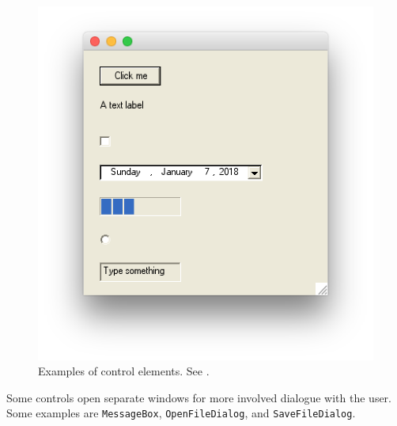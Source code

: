 \documentclass[fsharpNotes.tex]{subfiles}
\begin{document}
\begin{figure}
  \centering
  \includegraphics[scale=0.3]{controls}
  \caption{Examples of control elements. See .}
  \label{fig:controls}
\end{figure}

Some controls open separate windows for more involved dialogue with the user. Some examples are \lstinline{MessageBox}, \lstinline{OpenFileDialog}, and \lstinline{SaveFileDialog}.
\end{document}
